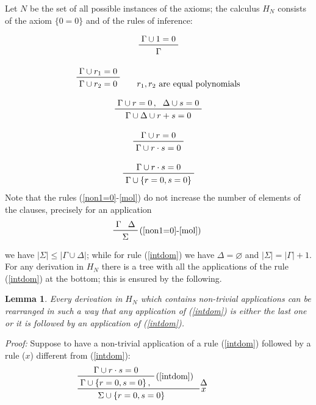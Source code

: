\documentclass[a4paper,12pt,oneside]{book}
\newtheorem{lemma}[theorem]{Lemma}
\let\emptyset\varnothing
\begin{document}
Let $N$ be the set of all possible instances of the axioms; the calculus $H_N$ consists of the axiom $\{0=0\}$ and of the rules of inference:

\begin{equation}\label{non1=0}
\prftree{\Gamma \cup 1=0}{\Gamma}
\end{equation}

\begin{equation}\label{eqpoly}
\prftree{\Gamma \cup r_1=0 } { \Gamma \cup r_2=0 } \qquad r_1,r_2\text{ are equal polynomials}
\end{equation}

\begin{equation}\label{somm}
\prftree{\Gamma \cup r=0 \, ,}{\Delta \cup s=0}{\Gamma \cup \Delta \cup r+s=0 } 
\end{equation}

\begin{equation} \label{mol}
\prftree{\Gamma \cup r=0}{\Gamma \cup r\cdot s=0 } 
\end{equation}

\begin{equation} \label{intdom}
\prftree{\Gamma \cup r\cdot s=0}{\Gamma \cup  \{r=0,s=0\} } 
\end{equation}
Note that the rules (\ref{non1=0}-\ref{mol}) do not increase the number of elements of the clauses, precisely for an application 
$$
\prftree[r]{(\ref{non1=0}-\ref{mol}) } {\Gamma}{\Delta}{\hspace{2mm}\Sigma\hspace{2mm}}
$$
we have $ |\Sigma| \leq   |\Gamma\cup\Delta|$; while for rule (\ref{intdom})
we have $\Delta = \emptyset$ and  $ |\Sigma| =   |\Gamma| +1 $. \\

For any derivation in $H_N$ there is a tree with all the applications of the rule (\ref{intdom}) at the bottom; this is ensured by the following.
\begin{lemma}\label{lemma_nullest}\textit{Every derivation in $H_N$ which contains non-trivial applications can be rearranged in such a way that any application of (\ref{intdom}) is either the last one or it is followed by an application of (\ref{intdom})}.
\end{lemma}
\emph{\noindent \textit{Proof: }}Suppose to have a non-trivial application of a rule (\ref{intdom}) followed by a rule ($x$) different from (\ref{intdom}):
$$
\prftree[r]{$x$}
{\prftree[r]{(\ref{intdom})}
{\Gamma\cup r\cdot s=0 }
{\Gamma\cup\{r=0, s=0 \}\,,}
}
{\Delta \hspace{13mm}} 
{\hspace{7mm}\Sigma\cup\{r=0,s=0 \}\hspace{13mm}}
$$
\end{document}
